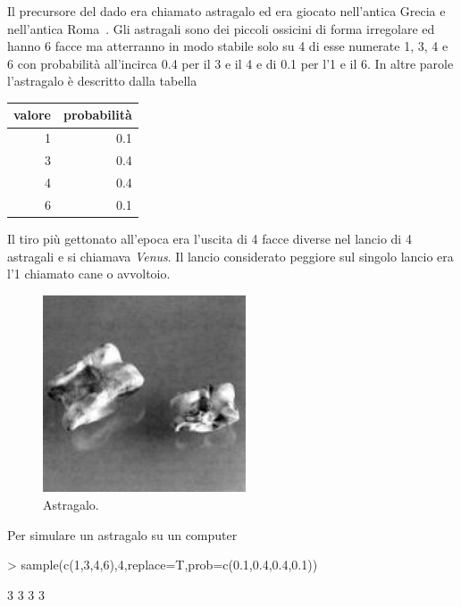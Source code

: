 \documentclass[onecolumn,12pt]{book}
\begin{document}
Il precursore  del dado era chiamato astragalo ed era giocato nell'antica Grecia e nell'antica Roma~\cite{david}.
Gli  astragali sono dei piccoli ossicini di forma irregolare ed hanno 6 facce ma atterranno in  modo stabile solo su 4 di esse numerate 1, 3, 4 e 6  con probabilit\`a all'incirca 0.4 per il 3 e il 4  e di 0.1 per l'1 e il 6. In altre parole l'astragalo \`e descritto dalla tabella

\begin{center}\begin{tabular}{|r|r |}
\hline
 valore&  probabilit\`a \\
\hline
1&0.1\\
3 &0.4\\
4& 0.4\\
6&0.1\\
 \hline
\end{tabular}
\end{center}
Il tiro pi\`u gettonato all'epoca era l'uscita di 4 facce diverse nel lancio di 4 astragali e si chiamava {\it Venus}.
Il lancio considerato peggiore sul singolo lancio era l'1 chiamato cane o avvoltoio.
\begin{figure}[htbp]
\begin{center}
\includegraphics[width=6cm]{../grafici/astragals.jpeg}
\caption{ Astragalo. }
\label{fig:astragalo}
\end{center}
\end{figure}
Per simulare un astragalo su un computer
\begin{Schunk}
\begin{Sinput}
> sample(c(1,3,4,6),4,replace=T,prob=c(0.1,0.4,0.4,0.1))
\end{Sinput}
\begin{Soutput}
[1] 3 3 3 3
\end{Soutput}
\end{Schunk}
\end{document}
